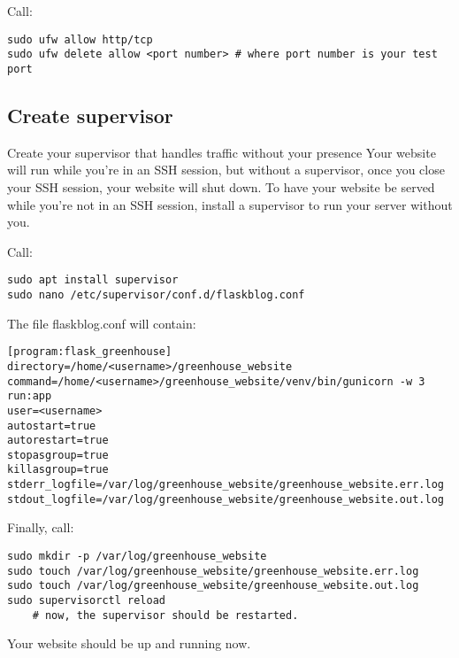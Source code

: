 Call:

\begin{verbatim}
sudo ufw allow http/tcp
sudo ufw delete allow <port number> # where port number is your test port
\end{verbatim}

\subsection{Create supervisor}\label{create-supervisor}

Create your supervisor that handles traffic without your presence Your
website will run while you're in an SSH session, but without a
supervisor, once you close your SSH session, your website will shut
down. To have your website be served while you're not in an SSH session,
install a supervisor to run your server without you.

Call:

\begin{verbatim}
sudo apt install supervisor
sudo nano /etc/supervisor/conf.d/flaskblog.conf
\end{verbatim}

The file flaskblog.conf will contain:

\begin{verbatim}
[program:flask_greenhouse]
directory=/home/<username>/greenhouse_website
command=/home/<username>/greenhouse_website/venv/bin/gunicorn -w 3 run:app
user=<username>
autostart=true
autorestart=true
stopasgroup=true
killasgroup=true
stderr_logfile=/var/log/greenhouse_website/greenhouse_website.err.log
stdout_logfile=/var/log/greenhouse_website/greenhouse_website.out.log
\end{verbatim}

Finally, call:

\begin{verbatim}
sudo mkdir -p /var/log/greenhouse_website
sudo touch /var/log/greenhouse_website/greenhouse_website.err.log
sudo touch /var/log/greenhouse_website/greenhouse_website.out.log
sudo supervisorctl reload
    # now, the supervisor should be restarted.
\end{verbatim}

Your website should be up and running now.